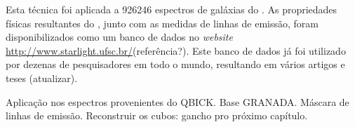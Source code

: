 Esta técnica foi aplicada a 926246 espectros de galáxias do \SDSS. As
propriedades físicas resultantes do \starlight, junto com as medidas de linhas
de emissão, foram disponibilizados como um banco de dados no {\em website}
\url{http://www.starlight.ufsc.br/}\fixme(referência?). Este banco de dados já
foi utilizado por dezenas de pesquisadores em todo o mundo, resultando em vários
artigos \citep[para citar alguns]{Bian2006, Liang2007, Peeples2009,
Lara-Lopez2009, Lara-Lopez2010} e teses \citep{Mateus2006, Gomes2009,
Asari2010}\fixme(atualizar).

\TODO Aplicação nos espectros provenientes do QBICK. Base GRANADA.
Máscara de linhas de emissão. Reconstruir os cubos: gancho pro próximo capítulo.


